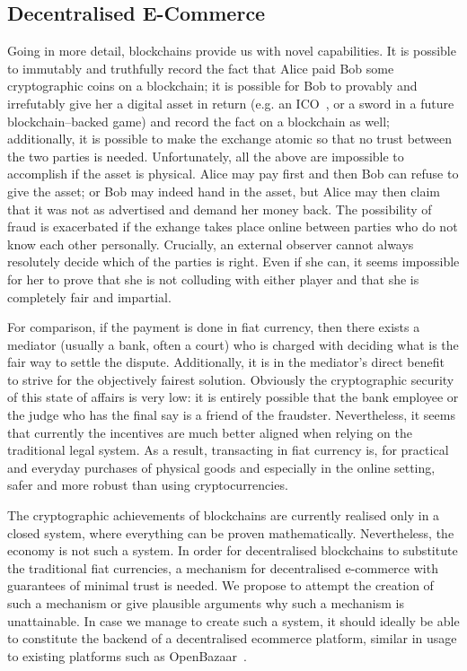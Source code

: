 \subsection{Decentralised E-Commerce}
  Going in more detail, blockchains provide us with novel capabilities. It is possible to
  immutably and truthfully record the fact that Alice paid Bob some cryptographic coins on
  a blockchain; it is possible for Bob to provably and irrefutably give her a digital
  asset in return (e.g. an ICO~\cite{eos}, or a sword in a future blockchain--backed game)
  and record the fact on a blockchain as well; additionally, it is possible to make the
  exchange atomic so that no trust between the two parties is needed. Unfortunately, all
  the above are impossible to accomplish if the asset is physical. Alice may pay first and
  then Bob can refuse to give the asset; or Bob may indeed hand in the asset, but Alice
  may then claim that it was not as advertised and demand her money back. The possibility
  of fraud is exacerbated if the exhange takes place online between parties who do not
  know each other personally. Crucially, an external observer cannot always resolutely
  decide which of the parties is right. Even if she can, it seems impossible for her to
  prove that she is not colluding with either player and that she is completely fair and
  impartial.

  For comparison, if the payment is done in fiat currency, then there exists a mediator
  (usually a bank, often a court) who is charged with deciding what is the fair way to
  settle the dispute. Additionally, it is in the mediator's direct benefit to strive for
  the objectively fairest solution. Obviously the cryptographic security of this state of
  affairs is very low: it is entirely possible that the bank employee or the judge who has
  the final say is a friend of the fraudster. Nevertheless, it seems that currently the
  incentives are much better aligned when relying on the traditional legal system. As a
  result, transacting in fiat currency is, for practical and everyday purchases of
  physical goods and especially in the online setting, safer and more robust than using
  cryptocurrencies.

  The cryptographic achievements of blockchains are currently realised only in a closed
  system, where everything can be proven mathematically. Nevertheless, the economy is not
  such a system. In order for decentralised blockchains to substitute the traditional fiat
  currencies, a mechanism for decentralised e-commerce with guarantees of minimal trust
  is needed. We propose to attempt the creation of such a mechanism or give plausible
  arguments why such a mechanism is unattainable. In case we manage to create such a
  system, it should ideally be able to constitute the backend of a decentralised ecommerce
  platform, similar in usage to existing platforms such as OpenBazaar~\cite{openbazaar}.

